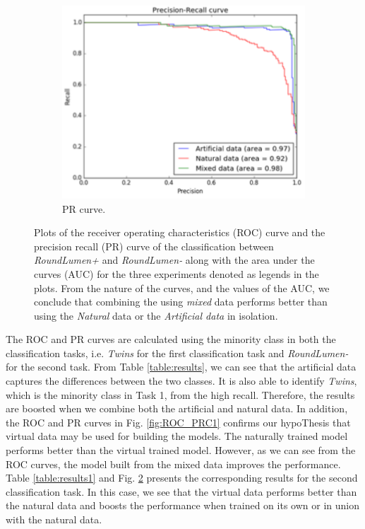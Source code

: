 \begin{figure}[ht!]
\begin{subfigure}[t]{0.5\textwidth}
          \includegraphics[width=1.0\linewidth]{img/roundlumens_PRC.pdf}
  \caption{PR curve.}
        \label{fig:PRC2}
    \end{subfigure}%
    \caption{Plots of the receiver operating characteristics (ROC) curve and the precision recall (PR) curve of the classification between \textit{RoundLumen+} and \textit{RoundLumen-} along with the area under the curves (AUC) for the three experiments denoted as legends in the plots. From the nature of the curves, and the values of the AUC, we conclude that combining the using \textit{mixed} data performs better than using the \textit{Natural} data or the \textit{Artificial data} in isolation.}
    \label{fig:ROC_PRC2}
\end{figure}

The ROC and PR curves are calculated using the minority class in both the classification tasks, i.e. \textit{Twins} for the first classification task and \textit{RoundLumen-} for the second task.
From Table \ref{table:results}, we can see that the artificial data captures the differences between the two classes. It is also able to identify \textit{Twins}, which is the minority class in Task 1, from the high recall. Therefore, the results are boosted when we combine both the artificial and natural data. In addition, the ROC and PR curves in Fig. \ref{fig:ROC_PRC1} confirms our hypoThesis that virtual data may be used for building the models. The naturally trained model performs better than the virtual trained model. However, as we can see from the ROC curves, the model built from the mixed data improves the performance. Table \ref{table:results1} and Fig.  \ref{fig:ROC_PRC2} presents the corresponding results for the second classification task. In this case, we see that the virtual data performs better than the natural data and boosts the performance when trained on its own or in union with the natural data.

